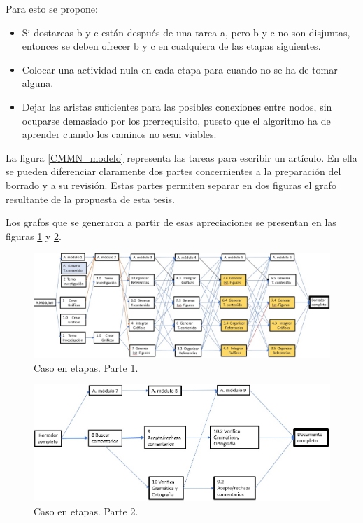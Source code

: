 Para esto se propone:

\begin{itemize}
    \item Si dostareas b y c están después de una tarea a, pero b y c no son disjuntas, entonces se deben ofrecer b y c en cualquiera de las etapas siguientes.
    \item Colocar una actividad nula en cada etapa para cuando no se ha de tomar alguna.
    \item Dejar las aristas suficientes para las posibles conexiones entre nodos, sin ocuparse demasiado por los prerrequisito, puesto que el algoritmo ha de aprender cuando los caminos no sean viables.
\end{itemize}


La figura \ref{CMMN_modelo} representa las tareas para escribir un artículo. En ella se pueden diferenciar claramente dos partes concernientes a la preparación del borrado y a su revisión. Estas partes permiten separar en dos figuras el grafo resultante de la propuesta de esta tesis.

Los grafos que se generaron a partir de esas apreciaciones se presentan en las figuras \ref{CMMN_modelo1} y \ref{CMMN_modelo2}.

\begin{figure}[h]
  \centering
    \includegraphics[scale=0.5]{DeCMMN1.jpg}
  \caption{Caso en etapas. Parte 1.}
  \label{CMMN_modelo1}
\end{figure}


\begin{figure}[h]
  \centering
    \includegraphics[scale=0.55]{DeCMMN2.jpg}
  \caption{Caso en etapas. Parte 2.}
  \label{CMMN_modelo2}
\end{figure}


